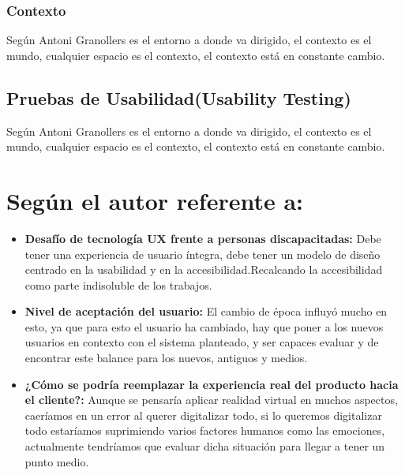 \documentclass[11pt]{article}
\begin{document}
\begin{normalsize}
\begin{flushleft}
	        \subsubsection{Contexto}
	        \begin{itemize}
	            Según Antoni Granollers es el entorno a donde va dirigido, el contexto es el mundo, cualquier espacio es el contexto, el contexto está en constante cambio.
	        \end{itemize}
	    \subsection{Pruebas de Usabilidad(Usability Testing)}
	    \begin{itemize}
	        Según Antoni Granollers es el entorno a donde va dirigido, el contexto es el mundo, cualquier espacio es el contexto, el contexto está en constante cambio.
	    \end{itemize}
	\section{  Según el autor referente a:}
	    \begin{itemize}
	        \item \textbf{Desafío de tecnología UX frente a personas discapacitadas: }Debe tener una experiencia de usuario íntegra, debe tener un modelo de diseño centrado en la usabilidad y en la accesibilidad.Recalcando la accesibilidad como parte indisoluble de los trabajos.
	        \break
	        \item \textbf{Nivel de aceptación del usuario: }El cambio de época influyó mucho en esto, ya que para esto el usuario ha cambiado, hay que poner a los nuevos usuarios en contexto con el sistema planteado, y ser capaces evaluar y de encontrar este balance para los nuevos, antiguos y medios.
	        \break
	        \item \textbf{¿Cómo se podría reemplazar la experiencia real del producto hacia el cliente?: }Aunque se pensaría aplicar realidad virtual en muchos aspectos, caeríamos en un error al querer digitalizar todo, si lo queremos digitalizar todo estaríamos suprimiendo varios factores humanos como las emociones,  actualmente tendríamos que evaluar dicha situación para llegar a tener un punto medio.
	        \break
	    \end{itemize}

\end{flushleft}
\end{normalsize}
\end{document}
